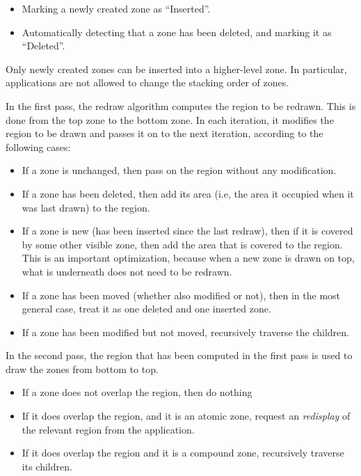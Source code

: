 \documentclass{report}
\begin{document}
\begin{itemize}
\item Marking a newly created zone as ``Inserted''. 
\item Automatically detecting that a zone has been deleted, and
  marking it as ``Deleted''. 
\end{itemize}

Only newly created zones can be inserted into a higher-level
zone.  In particular, applications are not allowed to change the
stacking order of zones. 

In the first pass, the redraw algorithm computes the region to be
redrawn.  This is done from the top zone to the bottom zone.  In
each iteration, it modifies the region to be drawn and passes it on to
the next iteration, according to the following cases:

\begin{itemize}
\item If a zone is unchanged, then pass on the region without any
  modification. 
\item If a zone has been deleted, then add its area (i.e, the area
  it occupied when it was last drawn) to the region.
\item If a zone is new (has been inserted since the last redraw),
  then if it is covered by some other visible zone, then add the
  area that is covered to the region.  This is an important
  optimization, because when a new zone is drawn on top, what is
  underneath does not need to be redrawn. 
\item If a zone has been moved (whether also modified or not), then
  in the most general case, treat it as one deleted and one inserted
  zone.
\item If a zone has been modified but not moved, recursively
  traverse the children.
\end{itemize}

In the second pass, the region that has been computed in the first
pass is used to draw the zones from bottom to top.

\begin{itemize}
\item If a zone does not overlap the region, then do nothing
\item If it does overlap the region, and it is an atomic zone,
  request an \emph{redisplay} of the relevant region from the
  application. 
\item If it does overlap the region and it is a compound zone,
  recursively traverse its children.
\end{itemize}
\end{document}
